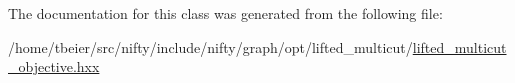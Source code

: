 The documentation for this class was generated from the following file\+:\begin{DoxyCompactItemize}
\item 
/home/tbeier/src/nifty/include/nifty/graph/opt/lifted\+\_\+multicut/\hyperlink{graph_2opt_2lifted__multicut_2lifted__multicut__objective_8hxx}{lifted\+\_\+multicut\+\_\+objective.\+hxx}\end{DoxyCompactItemize}
